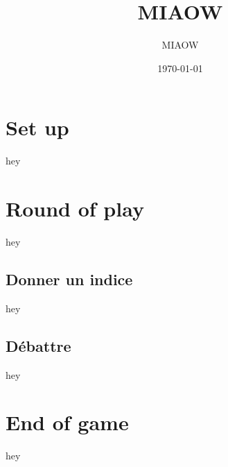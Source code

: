 \documentclass{article}%
\title{MIAOW}%
\author{MIAOW}%
\date{\today}%
\begin{document}
%
\pagestyle{empty}%
\normalsize%
\maketitle%
\section{ Set up
}%
\label{sec:Setup}%
hey

%
\section{ Round of play
}%
\label{sec:Roundofplay}%
hey

%
\subsection{ Donner un indice
}%
\label{subsec:Donnerunindice}%
hey

%
\subsection{ Débattre
}%
\label{subsec:Dbattre}%
hey

%
\section{ End of game
}%
\label{sec:Endofgame}%
hey

%
\end{document}
